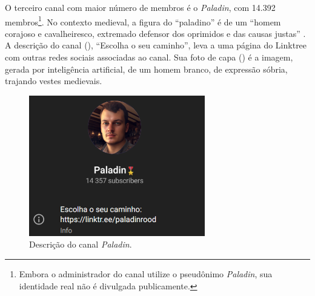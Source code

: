\documentclass[portuguese]{textolivre}
\begin{document}
O terceiro canal com maior número de membros é o \emph{Paladin}, com 14.392 membros\footnote{Embora o administrador do canal utilize o pseudônimo \emph{Paladin}, sua identidade real não é divulgada publicamente.}. No contexto medieval, a figura do ``paladino'' é de um ``homem corajoso e cavalheiresco, extremado defensor dos oprimidos e das causas justas'' \cite{michaelis2024}. A descrição do canal (), ``Escolha o seu caminho'', leva a uma página do Linktree com outras redes sociais associadas ao canal. Sua foto de capa () é a imagem, gerada por inteligência artificial, de um homem branco, de expressão sóbria, trajando vestes medievais.

\begin{figure}[h!]
    \centering
    \begin{minipage}[t]{0.47\textwidth}
        \centering        \includegraphics[width=\linewidth]{Imagens/Fig5.png}
        \caption{Descrição do canal \emph{Paladin}.}
        \label{fig-5}
    \end{minipage}
    \hfill
    \begin{minipage}[t]{0.37\textwidth}
        \centering

\end{minipage}
\end{figure}
\end{document}
